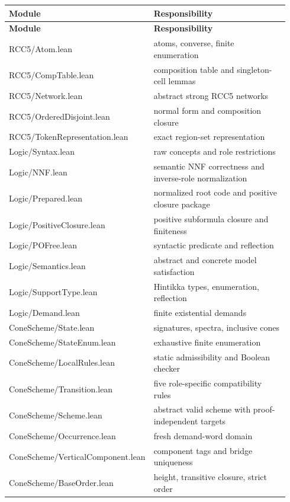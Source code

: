 \documentclass[11pt]{article}
\begin{document}
\begin{longtable}{>{\ttfamily\small}p{0.42\linewidth}p{0.52\linewidth}}
\toprule
\textnormal{\textbf{Module}} & \textbf{Responsibility} \\
\midrule
\endfirsthead
\toprule
\textnormal{\textbf{Module}} & \textbf{Responsibility} \\
\midrule
\endhead
RCC5/Atom.lean & atoms, converse, finite enumeration \\
RCC5/CompTable.lean & composition table and singleton-cell lemmas \\
RCC5/Network.lean & abstract strong RCC5 networks \\
RCC5/OrderedDisjoint.lean & normal form and composition closure \\
RCC5/TokenRepresentation.lean & exact region-set representation \\
Logic/Syntax.lean & raw concepts and role restrictions \\
Logic/NNF.lean & semantic NNF correctness and inverse-role normalization \\
Logic/Prepared.lean & normalized root code and positive closure package \\
Logic/PositiveClosure.lean & positive subformula closure and finiteness \\
Logic/POFree.lean & syntactic predicate and reflection \\
Logic/Semantics.lean & abstract and concrete model satisfaction \\
Logic/SupportType.lean & Hintikka types, enumeration, reflection \\
Logic/Demand.lean & finite existential demands \\
ConeScheme/State.lean & signatures, spectra, inclusive cones \\
ConeScheme/StateEnum.lean & exhaustive finite enumeration \\
ConeScheme/LocalRules.lean & static admissibility and Boolean checker \\
ConeScheme/Transition.lean & five role-specific compatibility rules \\
ConeScheme/Scheme.lean & abstract valid scheme with proof-independent targets \\
ConeScheme/Occurrence.lean & fresh demand-word domain \\
ConeScheme/VerticalComponent.lean & component tags and bridge uniqueness \\
ConeScheme/BaseOrder.lean & height, transitive closure, strict order \\

\end{longtable}
\end{document}
